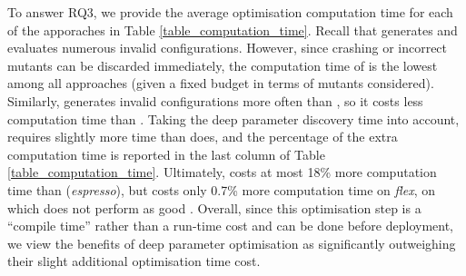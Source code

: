 To answer RQ3, we provide the average optimisation computation time for each of the apporaches in Table \ref{table_computation_time}. Recall that \dr{} generates and evaluates numerous invalid configurations. However, since crashing or incorrect mutants can be discarded immediately, the computation time of \dr{} is the lowest among all approaches (given a fixed budget in terms of mutants considered). Similarly, \dn{} generates invalid configurations more often than \sn{}, so it costs less computation time than \sn{}. Taking the deep parameter discovery time into account, \dn{} requires slightly more time than \sn{} does, and the percentage of the extra computation time is reported in the last column of Table \ref{table_computation_time}. Ultimately, \dn{} costs at most 18\% more computation time than \sn{} (\emph{espresso}), but costs only 0.7\% more computation time on \emph{flex}, on which \dn{} does not perform as good \sn{}. Overall, since this optimisation step is a ``compile time'' rather than a run-time cost and can be done before deployment, we view the benefits of deep parameter optimisation as significantly outweighing their slight additional optimisation time cost.


